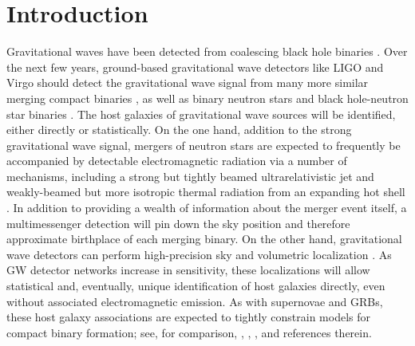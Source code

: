 \documentclass[nofootinbib,twocolumn,prd]{emulateapj}
\begin{document}
\section{Introduction}
Gravitational waves have been detected from  coalescing  black hole binaries \citep{DetectionPaper,LIGO-O1-BBH}. 
Over the next few years, ground-based gravitational wave detectors like LIGO 
and Virgo  should detect the gravitational
wave signal from many more similar merging compact binaries \citep{LIGO-O1-BBH,RatesPaper,gwastro-EventPopsynPaper-2016}, as well as  binary  neutron stars and black hole-neutron star binaries \citep{LIGO-Inspiral-Rates,popsyn-LowMetallicityImpact2c-StarTrackRevised-2014}.
%
The host galaxies of gravitational wave sources will be identified, either directly or statistically.  
On the one hand, addition to the strong gravitational wave signal, mergers of neutron stars are expected to  frequently be accompanied by detectable
electromagnetic radiation  via a number of  mechanisms, including a strong but tightly beamed
ultrarelativistic jet and weakly-beamed but more isotropic thermal radiation from an expanding hot shell
\citep[see,e.g.,][and references therein]{2013PhRvL.111r1101C,short-grb-GWCoincidenceEM-MetzgerBerger2011}.  
In addition to providing a wealth of information about the merger event itself, a multimessenger detection will pin down
the sky position and therefore approximate birthplace of each merging binary.    
%
On the other hand, gravitational wave detectors can perform high-precision sky and volumetric localization \cite{2016LRR....19....1A,2016arXiv160307333S}.  As GW detector
networks increase in sensitivity, these localizations will allow statistical and, eventually, unique identification of
host galaxies directly, even without associated electromagnetic emission.
%
As with supernovae and  GRBs, these host galaxy associations   are expected to tightly constrain models for compact binary
formation; see, for comparison,  \citet{2011MNRAS.412.1508M}, \citet{long-grb-GuettaPiran2007},
\citet{2014ARAA..52...43B}, and references therein. %
%
\end{document}
